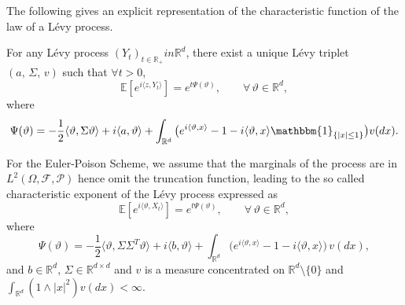 The following gives an explicit representation of the characteristic function of the law of a L\'evy process.
\begin{proposition}
For any L\'evy process $(Y_t)_{t \in \mathbb{R}_+} in \mathbb{R}^d$, there exist a unique L\'evy triplet $(a, \, \Sigma, \, v)$ such that $\forall t > 0$, 
\begin{equation*}
    \mathbb{E}[e^{i\langle z, Y_t\rangle}] = e^{t\Psi(\vartheta)}, \qquad \forall \, \vartheta \in \mathbb{R}^d,
\end{equation*}
where
\begin{equation}
    \Psi(\vartheta) = -\frac{1}{2}\langle \vartheta, \Sigma  \vartheta \rangle + i\langle a,\vartheta \rangle + \int_{\mathbb{R}^d} \big( e^{i\langle \vartheta,x \rangle } - 1 - {i\langle \vartheta,x \rangle } \mathbbm{1}_{\{|x|\leq1\}} \big) v(dx).
\end{equation}
\end{proposition}
For the Euler-Poison Scheme, we assume that the marginals of the process are in $L^2 (\Omega , \mathcal{F}, \mathcal{P})$ hence omit the truncation function, leading to the  so called characteristic exponent of the L\'evy process expressed as 
\begin{equation*}
    \mathbb{E}[e^{i\langle \vartheta, X_t\rangle}] = e^{t\Psi(\vartheta)}, \qquad \forall \, \vartheta \in \mathbb{R}^d,
\end{equation*}
where
\begin{equation}\label{inf_div_dist_levy}
    \Psi(\vartheta) = -\frac{1}{2}\langle \vartheta, \Sigma \Sigma^T \vartheta \rangle + i\langle b, \vartheta \rangle + \int_{\mathbb{R}^d} \big( e^{i\langle \vartheta,x \rangle } - 1 - {i\langle \vartheta,x \rangle }\big) \, v(dx),
\end{equation}
and $b \in \mathbb{R}^d$, $\Sigma \in \mathbb{R}^{d \times d}$ and $v$ is
a measure concentrated on $\mathbb{R}^d \setminus \{0\}$ and \break $\int_{\mathbb{R}^d} (1 \land |x|^2)  v(dx)< \infty.$

